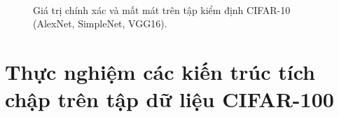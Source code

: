 \begin{figure}[ht!]
\begin{center}
{        }\\
%
    \end{center}
    \caption{%
        Giá trị chính xác và mất mát trên tập kiểm định CIFAR-10 (AlexNet, SimpleNet, VGG16).
     }%
   \label{fig:cifar10}
\end{figure}

\clearpage
\section{Thực nghiệm các kiến trúc tích chập trên tập dữ liệu CIFAR-100}\label{sec:cifar100}

